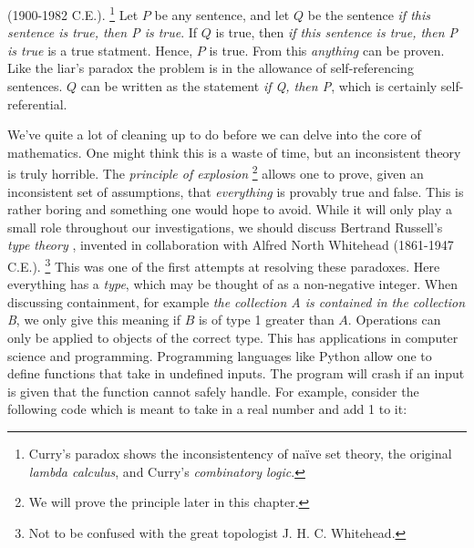         (1900-1982 C.E.).%
        \footnote{%
            Curry's paradox shows the inconsistentency of na\"{i}ve set theory,
            the original \textit{lambda calculus}, and Curry's
            \textit{combinatory logic}.
        }
        Let $P$ be any sentence, and let $Q$ be the sentence
        \textit{if this sentence is true, then P is true}. If $Q$ is true, then
        \textit{if this sentence is true, then P is true} is a true statment.
        Hence, $P$ is true. From this \textit{anything} can be proven. Like the
        liar's paradox the problem is in the allowance of self-referencing
        sentences. $Q$ can be written as the statement \textit{if Q, then P},
        which is certainly self-referential.
        \par\hfill\par
        We've quite a lot of cleaning up to do before we can delve into the core
        of mathematics. One might think this is a waste of time, but an
        inconsistent theory is truly horrible. The
        \textit{principle of explosion}%
        \footnote{We will prove the principle later in this chapter.}
        allows one to prove, given an inconsistent set of assumptions, that
        \textit{everything} is provably true and false. This is rather boring
        and something one would hope to avoid. While it will only play a small
        role throughout our investigations, we should discuss Bertrand
        Russell's \textit{type theory}%
        , invented in collaboration with
        Alfred North Whitehead
        (1861-1947 C.E.).%
        \footnote{%
            Not to be confused with the great topologist J. H. C. Whitehead.
        }
        This was one of the first attempts at resolving these paradoxes. Here
        everything has a \textit{type}, which may be thought of as a
        non-negative integer. When discussing containment, for example
        \textit{the collection A is contained in the collection B}, we only
        give this meaning if $B$ is of type 1 greater than $A$. Operations can
        only be applied to objects of the correct type. This has applications in
        computer science and programming. Programming languages like Python
        allow one to define functions that take in undefined inputs. The program
        will crash if an input is given that the function cannot safely handle.
        For example, consider the following code which is meant to take in a
        real number and add 1 to it:
